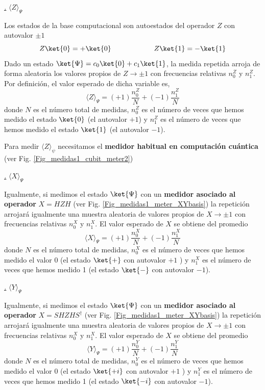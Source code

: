 \documentclass[a4paper,11pt]{book} %
\numberwithin{equation}{chapter}
\def\subsubiContadorIt{\par\addtocounter{subsubsection}{1}\underline{\it\thesubsubsection.}\hskip0.5cm \setcounter{subsubsubsectionIt}{0}}
\newcommand{\SubsubiIt}[1]{
		\subsubiContadorIt \textit{#1}
	}
\newcounter{subsubsubsectionIt}[subsubsection]
\begin{document}
	 
			\SubsubiIt{$\langle Z \rangle_\Psi$} 
			
Los estados de la base computacional son autoestados del operador $Z$ con autovalor $\pm 1$
$$
Z \ket{0} =+ \ket{0}   ~~~~~~~~ ~~~~~~~~~~ Z \ket{1} =-\ket{1} 
$$
Dado un estado $\ket{\Psi} = c_0\ket{0} + c_1\ket{1}$, la medida repetida arroja de forma aleatoria los valores propios de $Z \to \pm 1$ con frecuencias relativas $n^Z_{0} $ y $n^Z_{1}$. Por definición, el valor esperado de dicha variable es, 
	\begin{equation} \label{ec_medidas1_valor_esperado_Z}
	\boxed{\langle Z \rangle_\Psi = (+1)\frac{n^Z_{0}}{N}+ (-1) \frac{ n^Z_{1}}{N}}
	\end{equation}
donde $N$ es el número total de medidas, $n_{0}^Z$ es el número de veces que hemos medido el estado $\ket{0}$ (el autovalor $+1$) y $n_{1}^Z$ es el número de veces que hemos medido el estado $\ket{1}$ (el autovalor $-1$).

Para medir $\langle Z\rangle_\psi$ necesitamos el \textbf{medidor habitual en computación cuántica} (ver Fig. \ref{Fig_medidas1_cubit_meter2})
			
			\SubsubiIt{$\langle X \rangle_\Psi$} 
			
Igualmente, si medimos el estado $\ket{\Psi}$ con un \textbf{medidor asociado al operador} $X = HZH$ (ver Fig. \ref{Fig_medidas1_meter_XYbasis}) la repetición arrojará igualmente una muestra aleatoria de valores propios de $X\to \pm 1$ con frecuencias relativas $n^X_0$ y $n^X_1$.
El valor esperado de $X$ se obtiene del promedio
	\begin{equation} \label{ec_medidas1_valor_esperado_Z}
	\boxed{\langle X \rangle_\Psi = (+1)\frac{n^X_{0}}{N}+ (-1) \frac{ n^X_{1}}{N}}
	\end{equation}
donde $N$ es el número total de medidas, $n_{0}^X$ es el número de veces que hemos medido el valor 0 (el estado $\ket{+}$ con autovalor $+1$ ) y $n_{1}^X$ es el número de veces que hemos medido 1 (el estado $\ket{-}$ con autovalor $-1$).
			
			\SubsubiIt{$\langle Y \rangle_\Psi$} 
			
Igualmente, si medimos el estado $\ket{\Psi}$ con un \textbf{medidor asociado al operador} $X = SHZHS^\dagger$ (ver Fig. \ref{Fig_medidas1_meter_XYbasis}) la repetición arrojará igualmente una muestra aleatoria de valores propios de $X\to \pm 1$ con frecuencias relativas $n^X_0$ y $n^X_1$.
El valor esperado de $X$ se obtiene del promedio
	\begin{equation} \label{ec_medidas1_valor_esperado_Z}
	\boxed{\langle Y \rangle_\Psi = (+1)\frac{n^Y_{0}}{N}+ (-1) \frac{ n^Y_{1}}{N}}
	\end{equation}
donde $N$ es el número total de medidas, $n_{0}^Y$ es el número de veces que hemos medido el valor 0 (el estado $\ket{+i}$ con autovalor $+1$ ) y $n_{1}^Y$ es el número de veces que hemos medido 1 (el estado $\ket{-i}$ con autovalor $-1$).		
\end{document}
